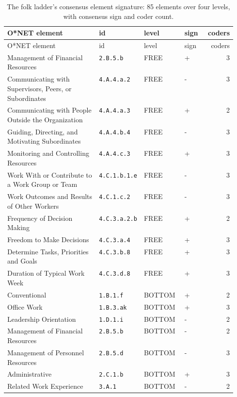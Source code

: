 \begingroup\small
\begin{longtable}[]{@{}p{0.40\linewidth}p{0.15\linewidth}llr@{}}
\caption{The folk ladder's consensus element signature: 85 elements over four levels, with consensus sign and coder count.}\label{tab:elements-levels}\\
\toprule\noalign{}
O*NET element & id & level & sign & coders \\
\midrule\noalign{}
\endfirsthead
\toprule\noalign{}
O*NET element & id & level & sign & coders \\
\midrule\noalign{}
\endhead
\bottomrule\noalign{}
\endlastfoot
Management of Financial Resources & \texttt{2.B.5.b} & FREE & + & 3 \\
Communicating with Supervisors, Peers, or Subordinates & \texttt{4.A.4.a.2} & FREE & - & 3 \\
Communicating with People Outside the Organization & \texttt{4.A.4.a.3} & FREE & + & 2 \\
Guiding, Directing, and Motivating Subordinates & \texttt{4.A.4.b.4} & FREE & - & 3 \\
Monitoring and Controlling Resources & \texttt{4.A.4.c.3} & FREE & + & 3 \\
Work With or Contribute to a Work Group or Team & \texttt{4.C.1.b.1.e} & FREE & - & 3 \\
Work Outcomes and Results of Other Workers & \texttt{4.C.1.c.2} & FREE & - & 3 \\
Frequency of Decision Making & \texttt{4.C.3.a.2.b} & FREE & + & 2 \\
Freedom to Make Decisions & \texttt{4.C.3.a.4} & FREE & + & 3 \\
Determine Tasks, Priorities and Goals & \texttt{4.C.3.b.8} & FREE & + & 3 \\
Duration of Typical Work Week & \texttt{4.C.3.d.8} & FREE & + & 3 \\
Conventional & \texttt{1.B.1.f} & BOTTOM & + & 2 \\
Office Work & \texttt{1.B.3.ak} & BOTTOM & + & 3 \\
Leadership Orientation & \texttt{1.D.1.i} & BOTTOM & - & 2 \\
Management of Financial Resources & \texttt{2.B.5.b} & BOTTOM & - & 2 \\
Management of Personnel Resources & \texttt{2.B.5.d} & BOTTOM & - & 3 \\
Administrative & \texttt{2.C.1.b} & BOTTOM & + & 3 \\
Related Work Experience & \texttt{3.A.1} & BOTTOM & - & 2 \\

\end{longtable}
